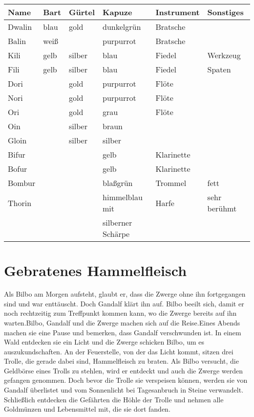 \documentclass[a4paper, 12pt]{scrartcl}
\begin{document}
\begin{table}
  \centering
  \label{tab:zwerge}
  \begin{tabular}{l||l|l|l|l|l}
  Name   & Bart & Gürtel & Kapuze & Instrument & Sonstiges \\
  \hline
  Dwalin & blau & gold & dunkelgrün & Bratsche & \\
  Balin & weiß & & purpurrot & Bratsche & \\
  Kili & gelb & silber & blau & Fiedel & Werkzeug \\
  Fili & gelb & silber & blau & Fiedel & Spaten \\
  Dori & & gold & purpurrot & Flöte & \\
  Nori & & gold & purpurrot & Flöte & \\
  Ori & & gold & grau & Flöte & \\
  Oin & & silber & braun & & \\
  Gloin & & silber & silber & & \\
  Bifur & & & gelb & Klarinette & \\
  Bofur & & & gelb & Klarinette & \\
  Bombur & & & blaßgrün & Trommel & fett \\
  Thorin & & & himmelblau mit & Harfe & sehr berühmt \\
         & & & silberner Schärpe & &
  \end{tabular}
\end{table}
%
\section{Gebratenes Hammelfleisch}
Als Bilbo am Morgen aufsteht, glaubt er, dass die Zwerge ohne ihn
fortgegangen sind und war enttäuscht. Doch Gandalf klärt ihn auf.
Bilbo beeilt sich, damit er noch rechtzeitig zum Treffpunkt kommen
kann, wo die Zwerge bereits auf ihn warten.Bilbo, Gandalf und die
Zwerge machen sich auf die Reise.Eines Abends machen sie eine Pause
und bemerken, dass Gandalf verschwunden ist. In einem Wald entdecken
sie ein Licht und die Zwerge schicken Bilbo, um es auszukundschaften.
An der Feuerstelle, von der das Licht kommt, sitzen drei Trolle, die
gerade dabei sind, Hammelfleisch zu braten. Als Bilbo versucht, die
Geldbörse eines Trolls zu stehlen, wird er entdeckt und auch die
Zwerge werden gefangen genommen. Doch bevor die Trolle sie verspeisen
können, werden sie von Gandalf überlistet und vom Sonnenlicht bei
Tagesanbruch in Steine verwandelt. Schließlich entdecken die Gefährten
die Höhle der Trolle und nehmen alle Goldmünzen und Lebensmittel mit,
die sie dort fanden.
\end{document}
